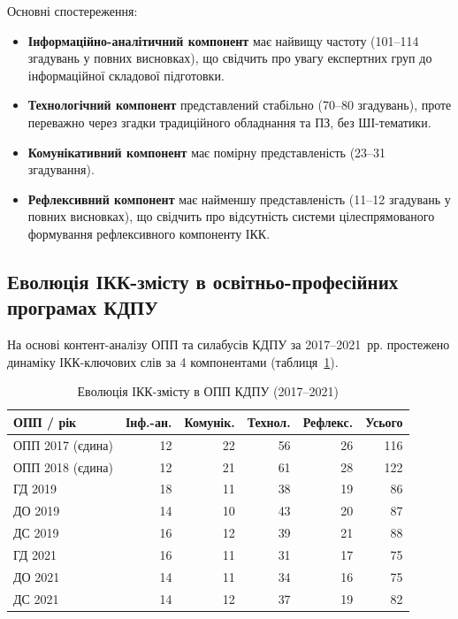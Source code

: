 Основні спостереження:
\begin{itemize}
    \item \textbf{Інформаційно-аналітичний компонент} має найвищу частоту (101--114 згадувань у повних висновках), що свідчить про увагу експертних груп до інформаційної складової підготовки.
    \item \textbf{Технологічний компонент} представлений стабільно (70--80 згадувань), проте переважно через згадки традиційного обладнання та ПЗ, без ШІ-тематики.
    \item \textbf{Комунікативний компонент} має помірну представленість (23--31 згадування).
    \item \textbf{Рефлексивний компонент} має найменшу представленість (11--12 згадувань у повних висновках), що свідчить про відсутність системи цілеспрямованого формування рефлексивного компоненту ІКК.
\end{itemize}

\subsection{Еволюція ІКК-змісту в освітньо-професійних програмах КДПУ}

На основі контент-аналізу ОПП та силабусів КДПУ за 2017--2021~рр. простежено динаміку ІКК-ключових слів за 4 компонентами (таблиця~\ref{tab:app-opp-evolution}).

\begin{table}[htbp]
\centering
\caption{Еволюція ІКК-змісту в ОПП КДПУ (2017--2021)}\label{tab:app-opp-evolution}
\small
\begin{tabularx}{\textwidth}{@{}Xrrrrr@{}}
\toprule
\textbf{ОПП / рік} & \textbf{Інф.-ан.} & \textbf{Комунік.} & \textbf{Технол.} & \textbf{Рефлекс.} & \textbf{Усього} \\
\midrule
ОПП 2017 (єдина) & 12 & 22 & 56 & 26 & 116 \\
ОПП 2018 (єдина) & 12 & 21 & 61 & 28 & 122 \\
\addlinespace
ГД 2019 & 18 & 11 & 38 & 19 & 86 \\
ДО 2019 & 14 & 10 & 43 & 20 & 87 \\
ДС 2019 & 16 & 12 & 39 & 21 & 88 \\
\addlinespace
ГД 2021 & 16 & 11 & 31 & 17 & 75 \\
ДО 2021 & 14 & 11 & 34 & 16 & 75 \\
ДС 2021 & 14 & 12 & 37 & 19 & 82 \\
\bottomrule
\end{tabularx}
\end{table}

